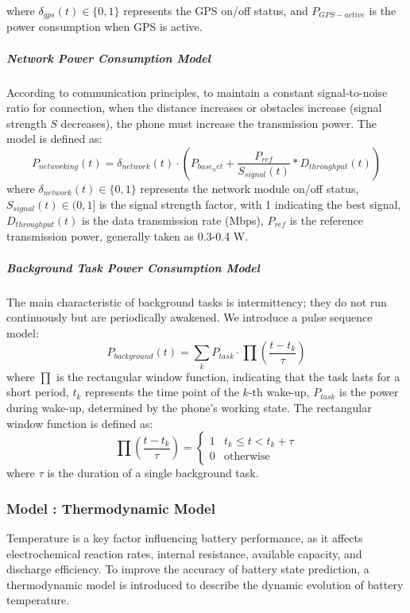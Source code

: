\documentclass{mcmthesis}
\newcommand{\Rmnum}[1]{\uppercase\expandafter{\romannumeral #1}}  %
\begin{document}
where $\delta _{gps}(t)\in \{0,1\}$ represents the GPS on/off status, and $P_{GPS-active}$ is the power consumption when GPS is active.
\subparagraph{Network Power Consumption Model}
According to communication principles, to maintain a constant signal-to-noise ratio for connection, when the distance increases or obstacles increase (signal strength $S$ decreases), the phone must increase the transmission power. The model is defined as:
\begin{equation}
    P_{networking}(t) = \delta_{network}(t) \cdot (P_{base_net}+\frac{P_{ref}}{S_{signal}(t)}\ast D_{throughput}(t))
\end{equation}
where
$\delta_{network}(t) \in \{0,1\}$ represents the network module on/off status,
$S_{signal}(t)\in (0,1]$ is the signal strength factor, with 1 indicating the best signal,
$D_{throughput}(t)$ is the data transmission rate (Mbps),
$P_{ref}$ is the reference transmission power, generally taken as 0.3-0.4 W.
\subparagraph{Background Task Power Consumption Model}
The main characteristic of background tasks is intermittency; they do not run continuously but are periodically awakened. We introduce a pulse sequence model:
\begin{equation}
    P_{background}(t) = \sum_{k} P_{task} \cdot \prod (\frac{t - t_k}{\tau })
\end{equation}
where $\prod $ is the rectangular window function, indicating that the task lasts for a short period,
 $t_k$ represents the time point of the $k$-th wake-up,
 $P_{task}$ is the power during wake-up, determined by the phone's working state.
The rectangular window function is defined as:
\begin{equation}
    \prod (\frac{t - t_k}{\tau }) = \begin{cases}
        1 & t_k \leq t < t_k + \tau \\
        0 & \text{otherwise}
    \end{cases}
\end{equation}
where $\tau$ is the duration of a single background task.
\subsubsection{Model \Rmnum{3}: Thermodynamic Model}
Temperature is a key factor influencing battery performance, as it affects electrochemical reaction rates, internal resistance, available capacity, and discharge efficiency.
To improve the accuracy of battery state prediction, a thermodynamic model is introduced to describe the dynamic evolution of battery temperature.
\end{document}
